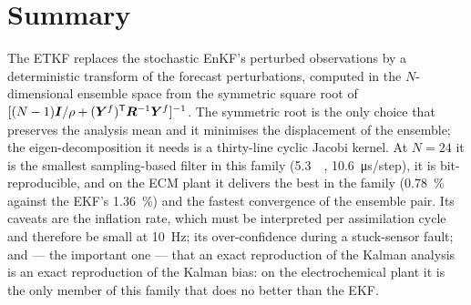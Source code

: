 \section{Summary}
The ETKF replaces the stochastic EnKF's perturbed observations by a deterministic transform of the
forecast perturbations, computed in the $N$-dimensional ensemble space from the symmetric square
root of $[(N-1)\bm{I}/\rho + (\bm{Y}^f)^{\mathsf{T}}\bm{R}^{-1}\bm{Y}^f]^{-1}$.  The symmetric root is the only choice
that preserves the analysis mean and it minimises the displacement of the ensemble; the
eigen-decomposition it needs is a thirty-line cyclic Jacobi kernel.  At $N=24$ it is the smallest
sampling-based filter in this family (\SI{5.3}{\kilo\byte}, \SI{10.6}{\micro\second}/step), it is
bit-reproducible, and on the ECM plant it delivers the best  in the family
(\SI{0.78}{\percent} against the EKF's \SI{1.36}{\percent}) and the fastest 
convergence of the ensemble pair.  Its caveats are the inflation rate, which must be interpreted per
assimilation cycle and therefore be small at \SI{10}{\hertz}; its over-confidence during a
stuck-sensor fault; and --- the important one --- that an exact reproduction of the Kalman analysis
is an exact reproduction of the Kalman bias: on the electrochemical plant it is the only member of
this family that does no better than the EKF.

